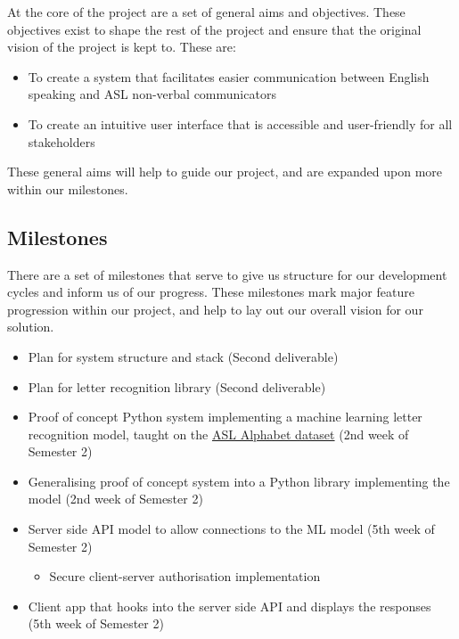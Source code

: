 \documentclass[10pt]{article}
\begin{document}
At the core of the project are a set of general aims and objectives. These objectives exist to 
shape the rest of the project and ensure that the original vision of the project is kept to. These 
are: 

\begin{itemize}
  \item To create a system that facilitates easier communication between English speaking and ASL 
    non-verbal communicators
  \item To create an intuitive user interface that is accessible and user-friendly for all 
    stakeholders
\end{itemize}

These general aims will help to guide our project, and are expanded upon more within our milestones.

\subsection{Milestones}

There are a set of milestones that serve to give us structure for our development cycles and 
inform us of our progress. These milestones mark major feature progression within our project, and 
help to lay out our overall vision for our solution.

\begin{itemize}
  \item Plan for system structure and stack (Second deliverable)
  \item Plan for letter recognition library (Second deliverable)
  \item Proof of concept Python system implementing a machine learning letter recognition model, 
    taught on the \href{https://www.kaggle.com/grassknoted/asl-alphabet}{ASL Alphabet dataset}  
    (2nd week of Semester 2)
  \item Generalising proof of concept system into a Python library implementing the model (2nd week 
    of Semester 2)
  \item Server side API model to allow connections to the ML model (5th week of Semester 2)
  \begin{itemize}
    \item Secure client-server authorisation implementation
  \end{itemize}
  \item Client app that hooks into the server side API and displays the responses (5th week of 
    Semester 2)

\end{itemize}
\end{document}
